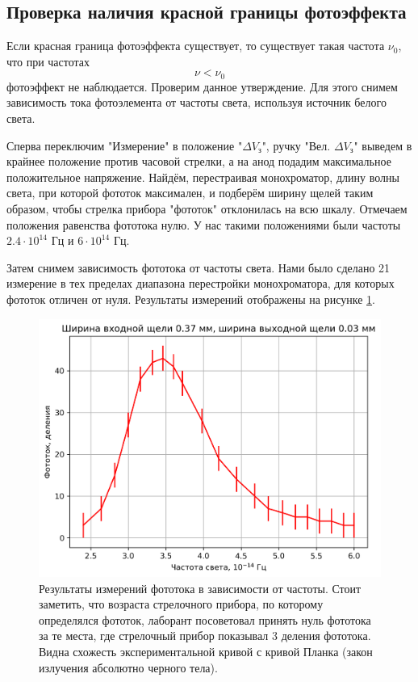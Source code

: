 \documentclass[12pt]{article}
\begin{document}
	\subsection{Проверка наличия красной границы фотоэффекта}
	Если красная граница фотоэффекта существует, то существует такая частота $\nu_0$, что при частотах
	\begin{equation}
		\nu < \nu_0
	\end{equation}
	фотоэффект не наблюдается. Проверим данное утверждение. Для этого снимем зависимость тока фотоэлемента от частоты света, используя источник белого света.
	\par Сперва переключим "{}Измерение"{} в положение "{}$\Delta V_\text{з}$"{}, ручку "{}Вел. $\Delta V_\text{з}$"{} выведем в крайнее положение против часовой стрелки, а на анод подадим максимальное положительное напряжение. Найдём, перестраивая монохроматор, длину волны света, при которой фототок максимален, и подберём ширину щелей таким образом, чтобы стрелка прибора "{}фототок"{} отклонилась на всю шкалу. Отмечаем положения равенства фототока нулю. У нас такими положениями были частоты $2.4\cdot 10^{14}$ Гц и $6\cdot 10^{14}$ Гц.
	\par Затем снимем зависимость фототока от частоты света. Нами было сделано 21 измерение в тех пределах диапазона перестройки монохроматора, для которых фототок отличен от нуля. Результаты измерений отображены на рисунке \ref{fig:3}.
	\begin{figure}[htbp]
		\centering
		\includegraphics[width=1\linewidth]{../plots/2.png}
		\caption{Результаты измерений фототока в зависимости от частоты. Стоит заметить, что возраста стрелочного прибора, по которому определялся фототок, лаборант посоветовал принять нуль фототока за те места, где стрелочный прибор показывал 3 деления фототока. Видна схожесть экспериментальной кривой с кривой Планка (закон излучения абсолютно черного тела).}
		\label{fig:3}
	\end{figure}
\end{document}
